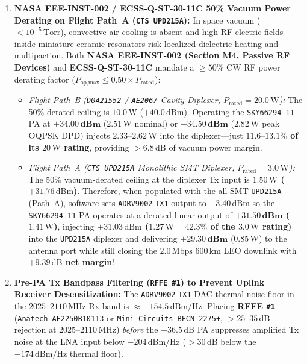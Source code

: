 \documentclass[10pt,a4paper]{article}
\renewcommand{\_}{\origunderscore\penalty0\hskip0pt\relax}
\numberwithin{equation}{section}
\numberwithin{table}{section}
\numberwithin{figure}{section}
\begin{document}
\begin{enumerate}
  \item \textbf{NASA EEE-INST-002 / ECSS-Q-ST-30-11C 50\% Vacuum Power Derating on Flight Path~A (\texttt{CTS UPD215A}):} In space vacuum ($<10^{-5}\,\text{Torr}$), convective air cooling is absent and high RF electric fields inside miniature ceramic resonators risk localized dielectric heating and multipaction. Both \textbf{NASA EEE-INST-002 (Section M4, Passive RF Devices)} and \textbf{ECSS-Q-ST-30-11C} mandate a $\ge 50\%$ CW RF power derating factor ($P_{\text{op,max}} \le 0.50 \times P_{\text{rated}}$):
  \begin{itemize}\setlength{\itemsep}{1.5pt}
    \item \emph{Flight Path~B (\texttt{D0421552} / \texttt{AE2067} Cavity Diplexer, $P_{\text{rated}} = 20.0\,\text{W}$):} The 50\% derated ceiling is $10.0\,\text{W}$ ($+40.0\,\text{dBm}$). Operating the \texttt{SKY66294-11} PA at $\mathbf{+34.00\,\text{dBm}}$ ($2.51\,\text{W}$ nominal) or $\mathbf{+34.50\,\text{dBm}}$ ($2.82\,\text{W}$ peak OQPSK DPD) injects $2.33\text{--}2.62\,\text{W}$ into the diplexer—just \textbf{$11.6\text{--}13.1\%$ of its $20\,\text{W}$ rating}, providing $>6.8\,\text{dB}$ of vacuum power margin.
    \item \emph{Flight Path~A (\texttt{CTS UPD215A} Monolithic SMT Diplexer, $P_{\text{rated}} = 3.0\,\text{W}$):} The 50\% vacuum-derated ceiling at the diplexer Tx input is \textbf{$1.50\,\text{W}$ ($+31.76\,\text{dBm}$)}. Therefore, when populated with the all-SMT \texttt{UPD215A} (Path~A), software sets \texttt{ADRV9002} \texttt{TX1} output to $-3.40\,\text{dBm}$ so the \texttt{SKY66294-11} PA operates at a derated linear output of \textbf{$\mathbf{+31.50\,\text{dBm}}$ ($1.41\,\text{W}$)}, injecting \textbf{$+31.03\,\text{dBm}$ ($1.27\,\text{W} = 42.3\%$ of the $3.0\,\text{W}$ rating)} into the \texttt{UPD215A} diplexer and delivering $\mathbf{+29.30\,\text{dBm}}$ ($0.85\,\text{W}$) to the antenna port while still closing the $2.0\,\text{Mbps}$ $600\,\text{km}$ LEO downlink with \textbf{$+9.39\,\text{dB}$ net margin}!
  \end{itemize}
  \item \textbf{Pre-PA Tx Bandpass Filtering (\texttt{RFFE \#1}) to Prevent Uplink Receiver Desensitization:} The \texttt{ADRV9002} \texttt{TX1} DAC thermal noise floor in the $2025\text{--}2110\,\text{MHz}$ Rx band is $\approx -154.5\,\text{dBm/Hz}$. Placing \textbf{RFFE \texttt{\#1}} (\texttt{Anatech AE2250B10113} or \texttt{Mini-Circuits BFCN-2275+}, $>25\text{--}35\,\text{dB}$ rejection at $2025\text{--}2110\,\text{MHz}$) \emph{before} the $+36.5\,\text{dB}$ PA suppresses amplified Tx noise at the LNA input below $-204\,\text{dBm/Hz}$ ($>30\,\text{dB}$ below the $-174\,\text{dBm/Hz}$ thermal floor).

\end{enumerate}
\end{document}
